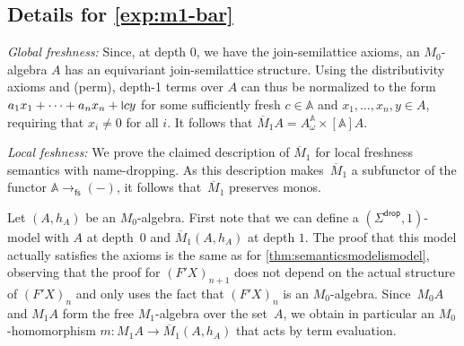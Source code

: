 \documentclass[a4paper,UKenglish,cleveref,thm-restate,numberwithinsect,final]{lipics-v2021}
\newcommand{\drop}{\mathsf{drop}}
\newcommand{\fs}{\mathsf{fs}}
\newcommand{\Names}{\mathbb{A}}
\newcommand{\mbar}{\overline{M}_1}
\theoremstyle{plain}
\newcommand{\midmid}{\hspace{0.2ex}{\rule[-0.1ex]{0.6pt}{1.65ex}}\hspace{0.2ex}}
\newcommand{\newletter}[1]{{\midmid}#1}
\numberwithin{equation}{section}
\newcommand{\+}[1]{\mathcal{#1}\xspace}
\theoremstyle{definition}
\begin{document}
\subsection{Details for \cref{exp:m1-bar}}
\label{sec:m1-bar-details}


\noindent\emph{Global freshness:} Since, at depth 0, we have the
join-semilattice axioms, an \(M_0\)-algebra $A$ has an equivariant
join-semilattice structure.  Using the distributivity axioms and
(perm), depth-1 terms over $A$ can thus be normalized to the form
\(a_1x_1 + \dots + a_nx_n + \newletter{c}y\) for some sufficiently
fresh \(c \in \Names\) and \(x_1, \dots, x_n, y \in A\), requiring
that \(x_i \neq 0\) for all \(i\).  It follows that
\(\mbar A = A^{\Names}_\omega \times [\Names]A\).

\noindent\emph{Local feshness:} We prove the claimed description of \(\mbar\)
for local freshness semantics with name-dropping. As this description
makes~$\mbar$ a subfunctor of the functor $\Names \to_\fs (-)$, it
follows that~$\mbar$ preserves monos.


Let \((A, h_A)\) be an \(M_0\)-algebra.  First note that we can define
a \((\Sigma^\drop, 1)\)-model with \(A\) at depth~\(0\) and
\(\mbar(A, h_A)\) at depth \(1\).  The proof that this model actually
satisfies the axioms is the same as for
\cref{thm:semanticsmodelismodel}, observing that the proof for
\((F'X)_{n+1}\) does not depend on the actual structure of \((F'X)_n\)
and only uses the fact that \((F'X)_n\) is an \(M_0\)-algebra.
Since~$M_0A$ and $M_1A$ form the free $M_1$-algebra over the set~$A$,
we obtain in particular an $M_0$-homomorphism
\(m\colon M_1A \to \mbar(A,h_A)\) that acts by term evaluation.
\end{document}
